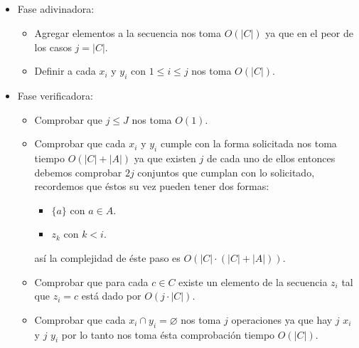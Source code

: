 \documentclass[spanish, xcolor=dvipsnames, aspectratio=169]{beamer}
\newcommand{\subsectiontitle}{}
\begin{document}
\subsection{\subsectiontitle}
\begin{frame}{\subsectiontitle}
    \begin{itemize}
        \item Fase adivinadora:
        \begin{itemize}
            \item Agregar elementos a la secuencia nos toma $O\left(|C|\right)$ ya que en el peor de los casos $j = |C|$.
            \item Definir a cada $x_{i}$ y $y_{i}$ con $1 \leq i \leq j$ nos toma $O\left(|C|\right)$.
        \end{itemize}
        \item Fase verificadora:
        \begin{itemize}
            \item Comprobar que $j \leq J$ nos toma $O\left(1\right)$.
            \item Comprobar que cada $x_{i}$ y $y_{i}$ cumple con la forma solicitada nos toma tiempo $O\left(|C| + |A|\right)$ ya que existen $j$ de cada uno de ellos entonces debemos comprobar $2j$ conjuntos que cumplan con lo solicitado, recordemos que éstos su vez pueden tener dos formas:
            \begin{itemize}
                \item $\{ a \}$ con $a \in A$.
                \item $z_{k}$ con $k < i$.
            \end{itemize}
            así la complejidad de éste paso es $O\left(|C| \cdot \left(|C| + |A|\right)\right)$.
            \item Comprobar que para cada $c \in C$ existe un elemento de la secuencia $z_{i}$
            tal que $z_{i} = c$ está dado por $O\left( j \cdot |C| \right)$.
            \item Comprobar que cada $x_{i} \cap y_{i} = \varnothing$ nos toma $j$ operaciones
            ya que hay $j$ $x_{i}$ y $j$ $y_{i}$ por lo tanto nos toma ésta comprobación tiempo $O\left(|C|\right)$.
        \end{itemize}
    \end{itemize}
\end{frame}
\renewcommand{\subsectiontitle}{Vertex cover (Cobertura de vértices)}
\end{document}

